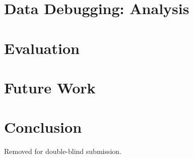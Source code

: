\documentclass{sigplanconf}
\begin{document}
%

\section{Data Debugging: Analysis}
\label{sec:analysis}


\section{Evaluation}
\label{sec:evaluation}


\section{Future Work}
\label{sec:future}


\section{Conclusion}
\label{sec:conclusion}




\acks
Removed for double-blind submission.

% 


{


}
\end{document}
